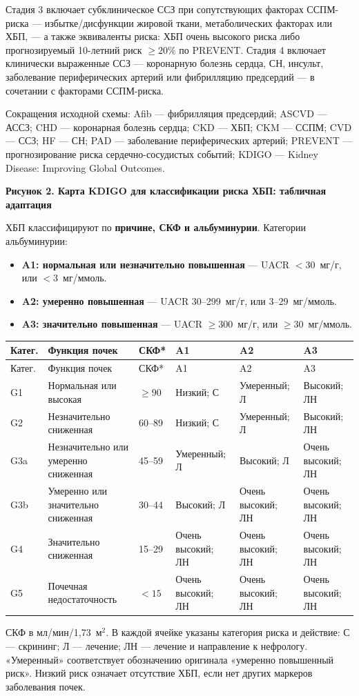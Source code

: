 \documentclass[11pt,a4paper]{article}
\newcommand{\heading}[1]{\par\medskip\textbf{#1}\par}
\newcommand{\unitgfr}{мл/мин/1,73~м$^2$}
\begin{document}
Стадия 3 включает субклиническое ССЗ при сопутствующих факторах ССПМ-риска --- избытке/дисфункции жировой ткани, метаболических факторах или ХБП, --- а также эквиваленты риска: ХБП очень высокого риска либо прогнозируемый 10-летний риск $\geq20\%$ по PREVENT. Стадия 4 включает клинически выраженные ССЗ --- коронарную болезнь сердца, СН, инсульт, заболевание периферических артерий или фибрилляцию предсердий --- в сочетании с факторами ССПМ-риска.

Сокращения исходной схемы: Afib --- фибрилляция предсердий; ASCVD --- АССЗ; CHD --- коронарная болезнь сердца; CKD --- ХБП; CKM --- ССПМ; CVD --- ССЗ; HF --- СН; PAD --- заболевание периферических артерий; PREVENT --- прогнозирование риска сердечно-сосудистых событий; KDIGO --- Kidney Disease: Improving Global Outcomes.

\heading{Рисунок 2. Карта KDIGO для классификации риска ХБП: табличная адаптация}
ХБП классифицируют по \textbf{причине, СКФ и альбуминурии}. Категории альбуминурии:
\begin{itemize}
\item \textbf{A1: нормальная или незначительно повышенная} --- UACR $<30$~мг/г, или $<3$~мг/ммоль.
\item \textbf{A2: умеренно повышенная} --- UACR 30--299~мг/г, или 3--29~мг/ммоль.
\item \textbf{A3: значительно повышенная} --- UACR $\geq300$~мг/г, или $\geq30$~мг/ммоль.
\end{itemize}

{\small
\begin{longtable}{P{0.09\textwidth}P{0.27\textwidth}P{0.10\textwidth}P{0.14\textwidth}P{0.14\textwidth}P{0.14\textwidth}}
\toprule Катег. & Функция почек & СКФ* & A1 & A2 & A3\\\midrule
\endfirsthead
\toprule Катег. & Функция почек & СКФ* & A1 & A2 & A3\\\midrule
\endhead
G1 & Нормальная или высокая & $\geq90$ & Низкий; С & Умеренный; Л & Высокий; ЛН\\
G2 & Незначительно сниженная & 60--89 & Низкий; С & Умеренный; Л & Высокий; ЛН\\
G3a & Незначительно или умеренно сниженная & 45--59 & Умеренный; Л & Высокий; Л & Очень высокий; ЛН\\
G3b & Умеренно или значительно сниженная & 30--44 & Высокий; Л & Очень высокий; ЛН & Очень высокий; ЛН\\
G4 & Значительно сниженная & 15--29 & Очень высокий; ЛН & Очень высокий; ЛН & Очень высокий; ЛН\\
G5 & Почечная недостаточность & $<15$ & Очень высокий; ЛН & Очень высокий; ЛН & Очень высокий; ЛН\\
\bottomrule
\end{longtable}
}
{\small *СКФ в \unitgfr. В каждой ячейке указаны категория риска и действие: С --- скрининг; Л --- лечение; ЛН --- лечение и направление к нефрологу. «Умеренный» соответствует обозначению оригинала «умеренно повышенный риск». Низкий риск означает отсутствие ХБП, если нет других маркеров заболевания почек.}
\end{document}
